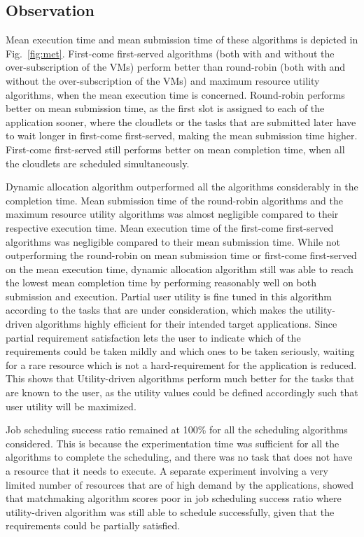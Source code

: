 \documentclass{llncs}
\begin{document}
\subsection{Observation}
Mean execution time and mean submission time of these algorithms is depicted in Fig.~\ref{fig:met}. First-come first-served algorithms (both with and without the over-subscription of the VMs) perform better than round-robin (both with and without the over-subscription of the VMs) and maximum resource utility algorithms, when the mean execution time is concerned. Round-robin performs better on mean submission time, as the first slot is assigned to each of the application sooner, where the cloudlets or the tasks that are submitted later have to wait longer in first-come first-served, making the mean submission time higher. First-come first-served still performs better on mean completion time, when all the cloudlets are scheduled simultaneously.

Dynamic allocation algorithm outperformed all the algorithms considerably in the completion time. Mean submission time of the round-robin algorithms and the maximum resource utility algorithms was almost negligible compared to their respective execution time. Mean execution time of the first-come first-served algorithms was negligible compared to their mean submission time. While not outperforming the round-robin on mean submission time or first-come first-served on the mean execution time, dynamic allocation algorithm still was able to reach the lowest mean completion time by performing reasonably well on both submission and execution. Partial user utility is fine tuned in this algorithm according to the tasks that are under consideration, which makes the utility-driven algorithms highly efficient for their intended target applications. Since partial requirement satisfaction lets the user to indicate which of the requirements could be taken mildly and which ones to be taken seriously, waiting for a rare resource which is not a hard-requirement for the application is reduced. This shows that Utility-driven algorithms perform much better for the tasks that are known to the user, as the utility values could be defined accordingly such that user utility will be maximized.

Job scheduling success ratio remained at 100\% for all the scheduling algorithms considered. This is because the experimentation time was sufficient for all the algorithms to complete the scheduling, and there was no task that does not have a resource that it needs to execute. A separate experiment involving a very limited number of resources that are of high demand by the applications, showed that matchmaking algorithm scores poor in job scheduling success ratio where utility-driven algorithm was still able to schedule successfully, given that the requirements could be partially satisfied.
\end{document}
